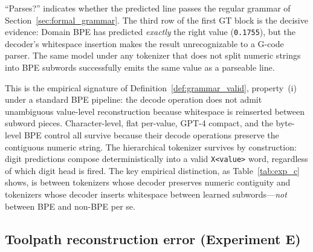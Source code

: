 \documentclass[11pt]{article}
\begin{document}
\begin{table}[htbp]
\smallskip
{\small ``Parses?'' indicates whether the predicted line passes the regular grammar of Section~\ref{sec:formal_grammar}. The third row of the first GT block is the decisive evidence: Domain BPE has predicted \emph{exactly} the right value (\texttt{0.1755}), but the decoder's whitespace insertion makes the result unrecognizable to a G-code parser. The same model under any tokenizer that does not split numeric strings into BPE subwords successfully emits the same value as a parseable line.}
\end{table}

This is the empirical signature of Definition~\ref{def:grammar_valid}, property~(i) under a standard BPE pipeline: the decode operation does not admit unambiguous value-level reconstruction because whitespace is reinserted between subword pieces. Character-level, flat per-value, GPT-4 compact, and the byte-level BPE control all survive because their decode operations preserve the contiguous numeric string. The hierarchical tokenizer survives by construction: digit predictions compose deterministically into a valid \texttt{X<value>} word, regardless of which digit head is fired. The key empirical distinction, as Table~\ref{tab:exp_c} shows, is between tokenizers whose decoder preserves numeric contiguity and tokenizers whose decoder inserts whitespace between learned subwords---\emph{not} between BPE and non-BPE per se.

\subsection{Toolpath reconstruction error (Experiment E)}
\label{sec:exp_e}
\end{document}

